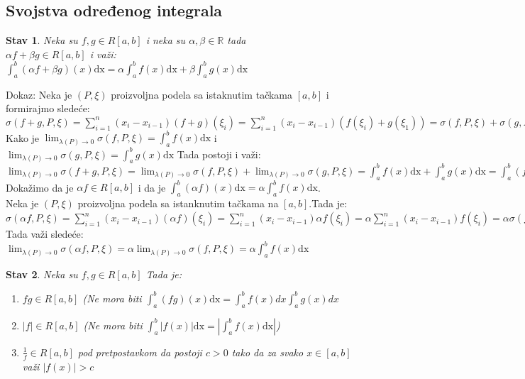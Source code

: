 \documentclass{article}
\newtheorem{stav}{Stav}[section]
\begin{document}
\subsection{Svojstva određenog integrala}
\begin{stavbox}
    \begin{stav}
        Neka su $f, g \in R[a, b]$ i neka su $\alpha, \beta \in \mathbb{R}$ tada\\
        $\alpha f +\beta g \in R[a, b]$ i važi:\\
        $\displaystyle \int^b_a(\alpha f + \beta g)(x)\text{dx} = \alpha\int^b_af(x)\text{dx} + \beta\int^b_ag(x)\text{dx}$
    \end{stav}
\end{stavbox}
Dokaz: Neka je $(P, \xi)$ proizvoljna podela sa istaknutim tačkama $[a, b]$ i formirajmo sledeće:\\
$\sigma(f+g, P, \xi) = \displaystyle \sum^n_{i=1} (x_i - x_{i-1})(f+g)(\xi_i) = \sum^n_{i=1} (x_i - x_{i-1})(f(\xi_i) + g(\xi_1)) = \sigma(f, P, \xi) + \sigma(g, P, \xi)$\\
Kako je $\displaystyle \lim_{\lambda(P)\longrightarrow0} \sigma(f, P, \xi) = \int^b_a f(x)\text{dx}$ i $\displaystyle \lim_{\lambda(P)\longrightarrow0} \sigma(g, P, \xi) = \int^b_a g(x)\text{dx}$ Tada postoji i važi: \\
$\displaystyle \lim_{\lambda(P)\longrightarrow0} \sigma(f+g, P, \xi) = \lim_{\lambda(P)\longrightarrow0} \sigma(f, P, \xi) + \lim_{\lambda(P)\longrightarrow0} \sigma(g, P, \xi) = \int^b_a f(x)\text{dx} + \int^b_a g(x)\text{dx} = \int^b_a (f+g)(x)\text{dx}$\\
Dokažimo da je $\alpha f \in R[a, b]$ i da je $\displaystyle \int^b_a (\alpha f)(x)\text{dx} = \alpha \int^b_a f(x) \text{dx}$.\\
Neka je $(P, \xi)$ proizvoljna podela sa istanknutim tačkama na $[a, b]$.Tada je: \\
$\sigma(\alpha f, P, \xi) = \displaystyle \sum^n_{i = 1} (x_i - x_{i-1})(\alpha f)(\xi_i) = \sum^n_{i = 1} (x_i - x_{i-1})\alpha f(\xi_i) = \alpha\sum^n_{i = 1} (x_i - x_{i-1})f(\xi_i) = \alpha\sigma(f, P, \xi) = \int^b_a f(x)\text{dx}$\\
Tada važi sledeće:\\
$\displaystyle \lim_{\lambda(P)\longrightarrow0} \sigma(\alpha f, P, \xi) = \alpha\lim_{\lambda(P)\longrightarrow 0}\sigma(f, P, \xi) = \alpha \int^b_a f(x)\text{dx}$
\begin{stavbox}
    \begin{stav}
        Neka su $f, g \in R[a, b]$ Tada je:
        \begin{enumerate}
            \item $fg \in R[a, b]$ (Ne mora biti $\displaystyle \int^b_a (fg)(x)\text{dx} = \int^b_af(x)dx  \int^b_ag(x)dx$
            \item $|f|\in R[a, b]$ (Ne mora biti $\displaystyle \int^b_a |f(x)|\text{dx} = |\int^b_a f(x)\text{dx}| $)
            \item $\frac{1}{f} \in R[a, b]$ pod pretpostavkom da postoji $c > 0$ tako da za svako $x \in [a, b]$ važi $|f(x)| > c$
        \end{enumerate}
    \end{stav}
\end{stavbox}
\end{document}
